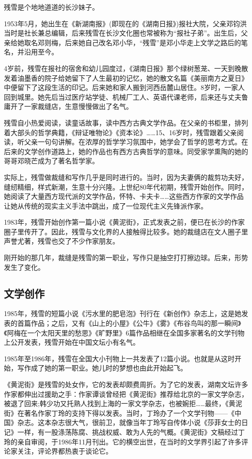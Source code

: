 \documentclass[fontset=fandol,12pt,a5paper]{ctexbook}
\begin{document}
残雪是个地地道道的长沙妹子。

1953年5月，她出生在《新湖南报》(即现在的《湖南日报》)报社大院，父亲邓钧洪当时是社长兼总编辑，后来残雪在长沙文化圈也常被称为“报社子弟”。出生后，父亲给她取名邓则梅，后来她自己改名邓小华，“残雪”是邓小华走上文学之路后的笔名，并沿用至今。

4岁前，残雪在报社的宿舍和幼儿园度过，《湖南日报》那个绿树葱茏、一天到晚散发着油墨香的院子给她留下了人生最初的记忆，她的散文名篇《美丽南方之夏日》中便留下了这段生活的印记。后来她和家人搬到河西岳麓山居住。8岁时，一家人回到城里。她先后当过医疗站学徒、机械厂工人、英语代课老师，后来还与丈夫鲁庸开了一家裁缝店，生意慢慢做出了名气。

残雪自小热爱阅读，读童话故事，读中西方古典文学作品。在父亲的书柜里，排列着大部头的哲学典籍，《辩证唯物论》《资本论》……15、16岁时，残雪跟着父亲阅读，听父亲一句句讲解。在浓厚的哲学学习氛围中，她学会了哲学的思考方式。在后来的文学创作道路上，她的作品也有西方古典哲学的意味。同受家学熏陶的她的哥哥邓晓芒成为了著名哲学家。

实际上，残雪做裁缝和写作几乎是同时进行的。当时，因为夫妻俩的裁剪功夫好，缝纫精细，样式新潮，生意十分兴隆。上世纪80年代初期，残雪开始创作。同时，她阅读了大量西方现代派的文学作品，怀特、卡夫卡……这些西方作家的文学作品让她从传统的现实主义手法中跳出，成了一位现代主义先锋派作家。

1983年，残雪开始创作第一篇小说《黄泥街》，正式发表之前，便已在长沙的作家圈子里传开了。因此，残雪与文化界的人接触得比较多。她的裁缝店在文人圈子里声誉尤著，残雪也交了不少作家朋友。

刚开始的那几年，裁缝是残雪的第一职业，写作只是抽空打打擦边球。后来，形势发生了变化。

\subsection{文学创作}

1985年，残雪的短篇小说《污水里的肥皂泡》刊行在《新创作》杂志上，这是她发表的首篇作品；之后，又有《山上的小屋》《公牛》《雾》《布谷鸟叫的那一瞬间》《阿梅在一个太阳天里的愁思》《旷野里》6篇作品相继在全国多家著名的文学刊物上公开发表，残雪开始在中国文坛小有名气。

1985年至1986年，残雪在全国大小刊物上一共发表了12篇小说。也就是从这时开始，写作成了她的第一职业。她儿时的梦想也由此开始起飞。

《黄泥街》是残雪的处女作，它的发表却颇费周折。为了它的发表，湖南文坛许多作家都伸出过援助之手：作家谭谈曾经把《黄泥街》推荐给北京的一家文学杂志，被退了回来;韩少功又托熟人找到上海的一家文学杂志，也被婉拒……最终，《黄泥街》在著名作家丁玲的支持下得以发表。当时，丁玲办了一个文学刊物——《中国》杂志。这本杂志很大气，很前卫，就像当年丁玲写自传体小说《莎菲女士的日记》一样，有一股涤荡陈腐、挑战权威、敢为人先的气概。《黄泥街》文稿经过丁玲的亲自审阅，于1986年11月刊出。它的横空出世，在当时的文学界引起了许多评论家关注，评论界都热衷于谈论它。
\end{document}
